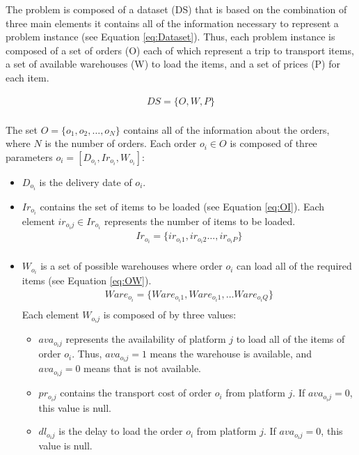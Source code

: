 \documentclass[letterpaper]{article} %
\begin{document}
The problem is composed of a dataset (DS) that is based on the combination of three main elements it contains all of the information necessary to represent a problem instance (see Equation \ref{eq:Dataset}). Thus, each problem instance is composed of a set of orders (O) each of which represent a trip to transport items, a set of available warehouses (W) to load the items, and a set of prices (P) for each item. 

\begin{equation}\label{eq:Dataset}
    \begin{aligned}
        DS = \{O, W, P\} \\
    \end{aligned}
\end{equation}
  
The set $O = \{o_1, o_2, \dots, o_N \}$ contains all of the information about the orders, where $N$ is the number of orders. Each order $o_i \in O$ is composed of three parameters $o_i =[D_{o_i},Ir_{o_i},W_{o_i}]$:
\begin{itemize}
    \item $D_{o_i}$ is the delivery date of $o_i$.
    \item $Ir_{o_i}$ contains the set of items to be loaded (see Equation \ref{eq:OI}). Each element $ir_{o_{i}j} \in Ir_{o_i}$ represents the number of items to be loaded.
    \begin{equation}\label{eq:OI}
        \begin{aligned}
            Ir_{o_{i}} = \{ ir_{o_{i}1}, ir_{o_{i}2} \dots, ir_{o_{i}P} \} \\
        \end{aligned}
    \end{equation}
    \item $W_{o_i}$ is a set of possible warehouses where order $o_i$ can load all of the required items (see Equation \ref{eq:OW}).
    \begin{equation} \label{eq:OW}
        \begin{aligned}
            Ware_{o_i} = \{ Ware_{o_{i}1}, Ware_{o_{i}1}, \dots Ware_{o_{i}Q} \}\\
        \end{aligned}
    \end{equation}
    Each element $W_{o_{i}j}$ is composed of by three values:
    \begin{itemize}
        \item $ava_{o_{i}j}$ represents the availability of platform $j$ to load all of the items of order $o_i$. Thus, $ava_{o_{i}j}=1$  means the warehouse is available, and $ava_{o_{i}j}=0$ means that is not available.
        \item $pr_{o_{i}j}$ contains the transport cost of order $o_i$ from platform $j$. If $ava_{o_{i}j}=0$, this value is null.
        \item $dl_{o_{i}j}$ is the delay to load the order $o_i$ from platform $j$. If $ava_{o_{i}j}=0$, this value is null.
    \end{itemize}
\end{itemize}
\end{document}

